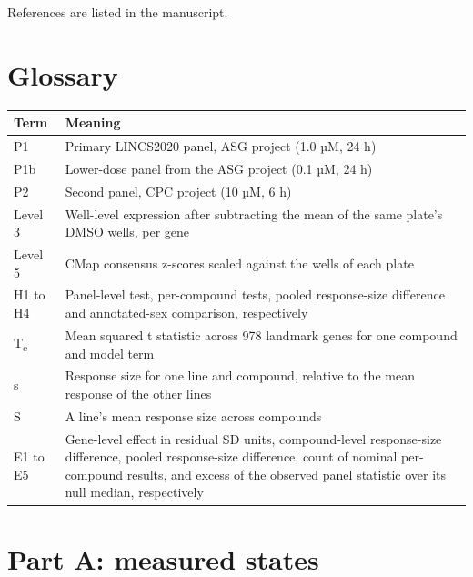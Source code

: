 \documentclass[
  11pt,
  letterpaper,
]{article}
\newcounter{none} %
\begin{document}
References are listed in the manuscript.

\section{Glossary}\label{glossary}

{\def\LTcaptype{none} %
\begin{longtable}[]{@{}
  >{\raggedright\arraybackslash}p{}
  >{\raggedright\arraybackslash}p{}@{}}
\toprule\noalign{}
\begin{minipage}[b]{\linewidth}\raggedright
Term
\end{minipage} & \begin{minipage}[b]{\linewidth}\raggedright
Meaning
\end{minipage} \\
\midrule\noalign{}
\endhead
\bottomrule\noalign{}
\endlastfoot
P1 & Primary LINCS2020 panel, ASG project (1.0 µM, 24 h) \\
P1b & Lower-dose panel from the ASG project (0.1 µM, 24 h) \\
P2 & Second panel, CPC project (10 µM, 6 h) \\
Level 3 & Well-level expression after subtracting the mean of the same
plate's DMSO wells, per gene \\
Level 5 & CMap consensus z-scores scaled against the wells of each
plate \\
H1 to H4 & Panel-level test, per-compound tests, pooled response-size
difference and annotated-sex comparison, respectively \\
T\textsubscript{c} & Mean squared t statistic across 978 landmark genes
for one compound and model term \\
s & Response size for one line and compound, relative to the mean
response of the other lines \\
S & A line's mean response size across compounds \\
E1 to E5 & Gene-level effect in residual SD units, compound-level
response-size difference, pooled response-size difference, count of
nominal per-compound results, and excess of the observed panel statistic
over its null median, respectively \\
\end{longtable}
}

\section{Part A: measured states}\label{part-a-measured-states}
\end{document}
